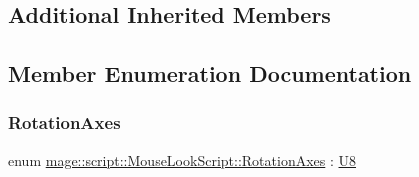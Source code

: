 \subsection*{Additional Inherited Members}


\subsection{Member Enumeration Documentation}
\hypertarget{classmage_1_1script_1_1_mouse_look_script_a662018db64c5dc84a958eb1c6123a829}{}\label{classmage_1_1script_1_1_mouse_look_script_a662018db64c5dc84a958eb1c6123a829} 
\subsubsection{\texorpdfstring{Rotation\+Axes}{RotationAxes}}
{\footnotesize\ttfamily enum \hyperlink{classmage_1_1script_1_1_mouse_look_script_a662018db64c5dc84a958eb1c6123a829}{mage\+::script\+::\+Mouse\+Look\+Script\+::\+Rotation\+Axes} \+: \hyperlink{namespacemage_afc638980bc6154f15af5e2d93a0e0ea9}{U8}\hspace{0.3cm}{\ttfamily [strong]}}


